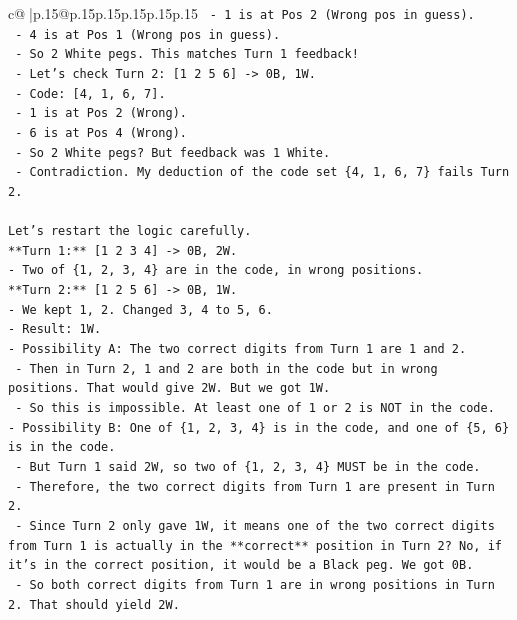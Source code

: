 \documentclass{article}
\begin{document}
{\begin{supertabular}{c@{$\;$}|p{.15\linewidth}@{}p{.15\linewidth}p{.15\linewidth}p{.15\linewidth}p{.15\linewidth}p{.15\linewidth}}
{{{\texttt{        {-} 1 is at Pos 2 (Wrong pos in guess).} \\
\texttt{        {-} 4 is at Pos 1 (Wrong pos in guess).} \\
\texttt{        {-} So 2 White pegs. This matches Turn 1 feedback!} \\
\texttt{    {-} Let's check Turn 2: {[}1 2 5 6{]} {-}> 0B, 1W.} \\
\texttt{      {-} Code: {[}4, 1, 6, 7{]}.} \\
\texttt{      {-} 1 is at Pos 2 (Wrong).} \\
\texttt{      {-} 6 is at Pos 4 (Wrong).} \\
\texttt{      {-} So 2 White pegs? But feedback was 1 White.} \\
\texttt{      {-} Contradiction. My deduction of the code set \{4, 1, 6, 7\} fails Turn 2.} \\
\\ 
\texttt{Let's restart the logic carefully.} \\
\texttt{**Turn 1:** {[}1 2 3 4{]} {-}> 0B, 2W.} \\
\texttt{{-} Two of \{1, 2, 3, 4\} are in the code, in wrong positions.} \\
\texttt{**Turn 2:** {[}1 2 5 6{]} {-}> 0B, 1W.} \\
\texttt{{-} We kept 1, 2. Changed 3, 4 to 5, 6.} \\
\texttt{{-} Result: 1W.} \\
\texttt{{-} Possibility A: The two correct digits from Turn 1 are 1 and 2.} \\
\texttt{  {-} Then in Turn 2, 1 and 2 are both in the code but in wrong positions. That would give 2W. But we got 1W.} \\
\texttt{  {-} So this is impossible. At least one of 1 or 2 is NOT in the code.} \\
\texttt{{-} Possibility B: One of \{1, 2, 3, 4\} is in the code, and one of \{5, 6\} is in the code.} \\
\texttt{  {-} But Turn 1 said 2W, so two of \{1, 2, 3, 4\} MUST be in the code.} \\
\texttt{  {-} Therefore, the two correct digits from Turn 1 are present in Turn 2.} \\
\texttt{  {-} Since Turn 2 only gave 1W, it means one of the two correct digits from Turn 1 is actually in the **correct** position in Turn 2? No, if it's in the correct position, it would be a Black peg. We got 0B.} \\
\texttt{  {-} So both correct digits from Turn 1 are in wrong positions in Turn 2. That should yield 2W.} \\
}}}
\end{supertabular}}
\end{document}
